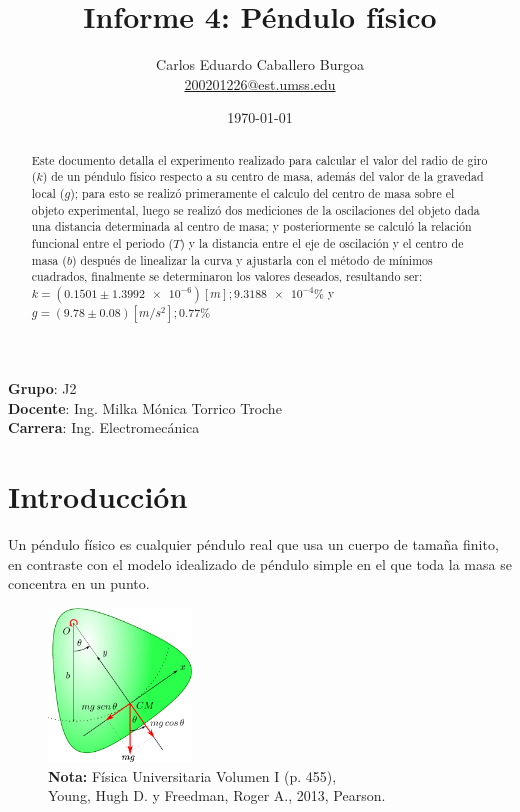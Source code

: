 \documentclass[letter,11pt]{article}
\title{Informe 4: Péndulo físico}
\author{Carlos Eduardo Caballero Burgoa \\
    \small{\href{mailto:200201226@est.umss.edu}{200201226@est.umss.edu}}
}
\date{\today}
\newcommand{\source}[1]{\vspace{-11pt} \caption*{\small{\textbf{Nota:} {#1}}}}
\begin{document}
\maketitle
\begin{center}
    \textbf{Grupo}: J2\\
    \textbf{Docente}: Ing. Milka Mónica Torrico Troche\\
    \textbf{Carrera}: Ing. Electromecánica
\end{center}

\begin{abstract}
Este documento detalla el experimento realizado para calcular el valor del radio
de giro ($k$) de un péndulo físico respecto a su centro de masa, además del
valor de la gravedad local ($g$); para esto se realizó primeramente el calculo
del centro de masa sobre el objeto experimental, luego se realizó dos mediciones
de la oscilaciones del objeto dada una distancia determinada al centro de masa;
y posteriormente se calculó la relación funcional entre el periodo ($T$) y la
distancia entre el eje de oscilación y el centro de masa ($b$) después de
linealizar la curva y ajustarla con el método de mínimos cuadrados, finalmente
se determinaron los valores deseados, resultando ser:
$k = (0.1501 \pm \num{1.3992e-6}) [m]; \num{9.3188e-4}\%$ y
$g = (9.78 \pm 0.08) [m/s^2]; 0.77\%$
\end{abstract}

\section{Introducción}

Un péndulo físico es cualquier péndulo real que usa un cuerpo de tamaña finito,
en contraste con el modelo idealizado de péndulo simple en el que toda la masa
se concentra en un punto.

\begin{figure}
\centering
\includegraphics[width=0.34\textwidth]{resources/f1.eps}
\caption{Dinámica de un péndulo físico.}
\label{figura1}
\source{Física Universitaria Volumen I (p. 455), \\
Young, Hugh D. y Freedman, Roger A., 2013, Pearson.}
\end{figure}
\end{document}
